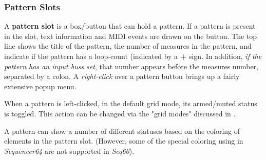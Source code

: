 \subsubsection{Pattern Slots}
\label{subsubsec:patterns_pattern_slot}

   A \textbf{pattern slot} is a box/button that can hold a pattern.
   If a pattern is present in the slot, text information and MIDI
   events are drawn on the button.
   The top line shows
   the title of the pattern, the number of measures in the pattern, and
   indicate if the pattern has a loop-count (indicated by a \textbf{+} sign.
   In addition, \textsl{if the pattern has an input buss set}, that number
   appears before the measures number, separated by a colon.
   A \textsl{right-click} over a pattern button brings up a fairly extensive
   popup menu.

   When a pattern is left-clicked, in the default grid mode,
   its armed/muted status is toggled.
   This action can be changed via the "grid modes" discussed in
   .

%

   A pattern can show a number of different statuses based on the coloring
   of elements in the pattern slot.
   (However, some of the special coloring using in
   \textsl{Sequencer64} are not supported in \textsl{Seq66}).

